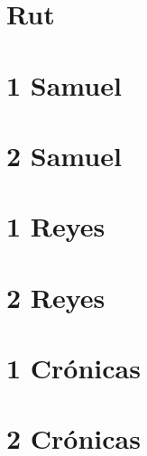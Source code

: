 \chapter{Rut}
\begin{multicols}{2}
  \parskip=0pt \relax
  
\end{multicols}

\chapter{1 Samuel}
\begin{multicols}{2}
  \parskip=0pt \relax
  
\end{multicols}

\chapter{2 Samuel}
\begin{multicols}{2}
  \parskip=0pt \relax
  
\end{multicols}

\chapter{1 Reyes}
\begin{multicols}{2}
  \parskip=0pt \relax
  
\end{multicols}

\chapter{2 Reyes}
\begin{multicols}{2}
  \parskip=0pt \relax
  
\end{multicols}

\chapter{1 Crónicas}
\begin{multicols}{2}
  \parskip=0pt \relax
  
\end{multicols}

\chapter{2 Crónicas}
\begin{multicols}{2}
  \parskip=0pt \relax
  
\end{multicols}

